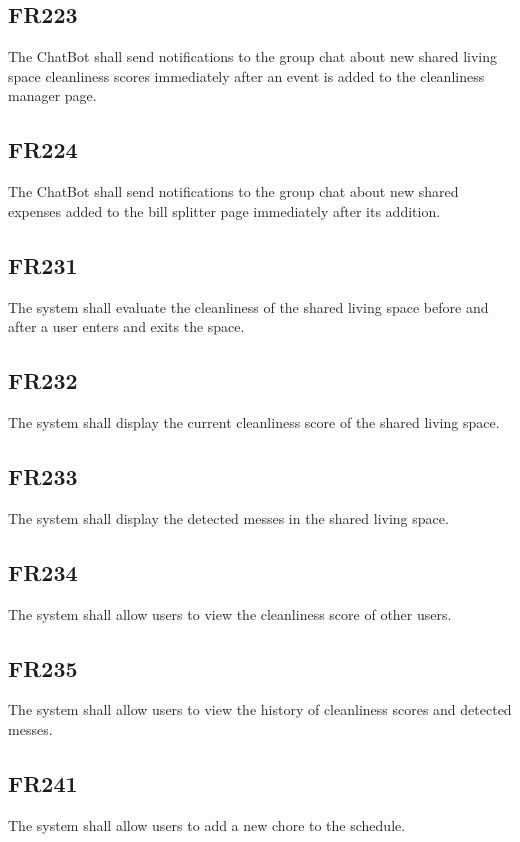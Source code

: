 \documentclass[12pt, titlepage]{article}
\begin{document}
\subsection{FR223}
The ChatBot shall send notifications to the group chat about new
shared living space cleanliness scores immediately after an event is added to
the cleanliness manager page.

\subsection{FR224}
The ChatBot shall send notifications to the group chat about new
shared expenses added to the bill splitter page immediately after its
addition.

\subsection{FR231}
The system shall evaluate the cleanliness of the shared living space before and after a user enters and exits the space.

\subsection{FR232}

The system shall display the current cleanliness score of the shared living space.
\subsection{FR233}

The system shall display the detected messes in the shared living space.
\subsection{FR234}

The system shall allow users to view the cleanliness score of other users.

\subsection{FR235}
The system shall allow users to view the history of cleanliness scores and detected messes.

\subsection{FR241}
The system shall allow users to add a new chore to the schedule.
\end{document}

